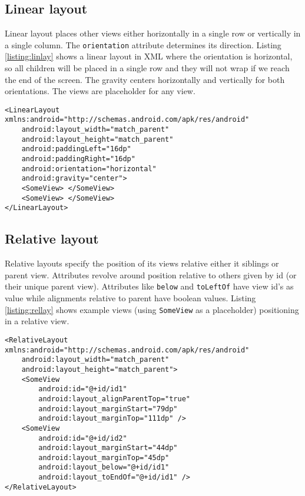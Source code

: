 \subsection{Linear layout}
Linear layout places other views either horizontally in a single row or vertically in a single column. The \texttt{orientation} attribute determines its direction. Listing \ref{listing:linlay} shows a linear layout in XML where the orientation is horizontal, so all children will be placed in a single row and they will not wrap if we reach the end of the screen. The gravity centers horizontally and vertically for both orientations. The views are placeholder for any view.
\begin{lstlisting}[style=A_XML, caption={Linear layout declaration}, label = {listing:linlay}]
<LinearLayout xmlns:android="http://schemas.android.com/apk/res/android"
    android:layout_width="match_parent"
    android:layout_height="match_parent"
    android:paddingLeft="16dp"
    android:paddingRight="16dp"
    android:orientation="horizontal"
    android:gravity="center">
    <SomeView> </SomeView>
    <SomeView> </SomeView>
</LinearLayout>
\end{lstlisting}

\subsection{Relative layout}
Relative layouts specify the position of its views relative either it siblings or parent view. Attributes revolve around position relative to others given by id (or their unique parent view). Attributes like \texttt{below} and \texttt{toLeftOf} have view id's as value while alignments relative to parent have boolean values. Listing \ref{listing:rellay} shows example views (using \texttt{SomeView} as a placeholder) positioning in a relative view.
\begin{lstlisting}[style=A_XML, caption={Relative layout declaration}, label = {listing:rellay}]
<RelativeLayout xmlns:android="http://schemas.android.com/apk/res/android"
    android:layout_width="match_parent"
    android:layout_height="match_parent">
    <SomeView
        android:id="@+id/id1"
        android:layout_alignParentTop="true"
        android:layout_marginStart="79dp"
        android:layout_marginTop="111dp" />
    <SomeView
        android:id="@+id/id2"
        android:layout_marginStart="44dp"
        android:layout_marginTop="45dp"
        android:layout_below="@+id/id1"
        android:layout_toEndOf="@+id/id1" />
</RelativeLayout>
\end{lstlisting}

